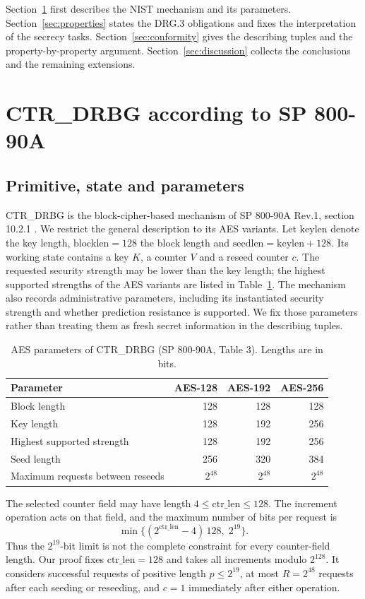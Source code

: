 \documentclass[journal=tosc,preprint,floatrow,nohyperxmp]{iacrtrans}
\numberwithin{lemma}{section}
\numberwithin{proposition}{section}
\numberwithin{equation}{section}
\theoremstyle{definition}
\numberwithin{definition}{section}
\theoremstyle{plain}
\begin{document}
Section~\ref{sec:algorithm} first describes the NIST mechanism and its parameters. Section~\ref{sec:properties} states the DRG.3 obligations and fixes the interpretation of the secrecy tasks. Section~\ref{sec:conformity} gives the describing tuples and the property-by-property argument. Section~\ref{sec:discussion} collects the conclusions and the remaining extensions.

\section{CTR\_DRBG according to SP 800-90A}\label{sec:algorithm}
\subsection{Primitive, state and parameters}
CTR\_DRBG is the block-cipher-based mechanism of SP 800-90A Rev.1, section 10.2.1 \cite{90a}. We restrict the general description to its AES variants. Let $\mathrm{keylen}$ denote the key length, $\mathrm{blocklen}=128$ the block length and $\mathrm{seedlen}=\mathrm{keylen}+128$. Its working state contains a key $K$, a counter $V$ and a reseed counter $c$. The requested security strength may be lower than the key length; the highest supported strengths of the AES variants are listed in Table~\ref{tab:aes-parameters}. The mechanism also records administrative parameters, including its instantiated security strength and whether prediction resistance is supported. We fix those parameters rather than treating them as fresh secret information in the describing tuples.

\begin{table}[htbp]
\caption{AES parameters of CTR\_DRBG (SP 800-90A, Table 3). Lengths are in bits.}\label{tab:aes-parameters}
\centering\small
\begin{tabularx}{\linewidth}{@{}Xrrr@{}}
\toprule
Parameter & AES-128 & AES-192 & AES-256\\
\midrule
Block length & 128 & 128 & 128\\
Key length & 128 & 192 & 256\\
Highest supported strength & 128 & 192 & 256\\
Seed length & 256 & 320 & 384\\
Maximum requests between reseeds & $2^{48}$ & $2^{48}$ & $2^{48}$\\
\bottomrule
\end{tabularx}
\end{table}

The selected counter field may have length $4\le\mathrm{ctr\_len}\le128$. The increment operation acts on that field, and the maximum number of bits per request is
\begin{equation}
 \min\bigl\{(2^{\mathrm{ctr\_len}}-4)\,128,\;2^{19}\bigr\}.
 \label{eq:nist-request-limit}
\end{equation}
Thus the $2^{19}$-bit limit is not the complete constraint for every counter-field length. Our proof fixes $\mathrm{ctr\_len}=128$ and takes all increments modulo $2^{128}$. It considers successful requests of positive length $p\le2^{19}$, at most $R=2^{48}$ requests after each seeding or reseeding, and $c=1$ immediately after either operation.
\end{document}
